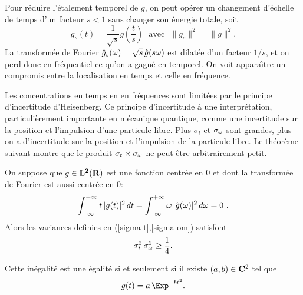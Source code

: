 Pour r\'{e}duire l'\'{e}talement temporel de $g$, 
on peut op\'{e}rer un 
changement d'\'{e}chelle de temps d'un facteur $s<1$ sans changer son 
\'{e}nergie totale, soit
\[
g_s (t) = \frac 1 {\sqrt s} g( \frac t s ) ~~~\mbox{avec}~~~
\| g_s \|^2 = \|g \|^2.
\]
La transform\'{e}e de Fourier $\hat g_s ( {\omega} ) = \sqrt s\, \hat	g( s {\omega} )$
est dilat\'{e}e d'un facteur $1/s$, et on perd donc en fr\'{e}quentiel 
ce qu'on a gagn\'{e} en temporel. On voit appara\^{\i}tre un compromis 
entre la localisation en temps et celle en fr\'{e}quence.

Les concentrations en temps en en fr\'{e}quences sont limit\'{e}es par 
le principe d'incertitude d'Heisenberg. Ce principe 
d'incertitude \`{a} une interpr\'{e}tation, particuli\`{e}rement 
importante en m\'{e}canique quantique, comme une incertitude sur la 
position et l'impulsion d'une particule libre.
Plus $\sigma_t$ et $\sigma_{\omega}$ sont grandes, plus on a 
d'incertitude 
sur la position et l'impulsion de la particule libre.
Le th\'eor\`eme suivant montre que le produit
$\sigma_t \times \sigma_{\omega}$ ne peut \^etre arbitrairement
petit.

\begin{theorem}
\label{uncert}
On suppose que $g \in {\bf L ^ 2 ({\bf{R}})}$ est une fonction centr\'ee en
$0$ et dont la transform\'ee de Fourier est aussi centr\'ee en
$0$:
\[
\int_{-\infty}^{+\infty} t \,|g(t)|^2\, dt = 
\int_{-\infty}^{+\infty} {\omega} \,|\hat g({\omega})|^2\, d{\omega} = 0 ~.
\]
Alors les variances definies en (\ref{sigma-t},\ref{sigma-om})
satisfont
\begin{equation}
\label{uncertainty}
\sigma^2_t\, \sigma^2_{\omega} \geq \frac 1 4 .
\end{equation}

Cette in\'{e}galit\'{e} est une \'{e}galit\'{e} si et seulement si il 
existe $(a,b) \in {\bf{C}}^2$  tel que
\begin{equation}
\label{Gabor}
g(t) =  a \, \Exp^{-b t^2} .
\end{equation}
\end{theorem}

